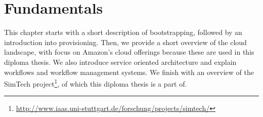 \chapter{Fundamentals}
\label{fundamentals}

This chapter starts with a short description of bootstrapping, followed by an introduction into provisioning.
Then, we provide a short overview of the cloud landscape, with focus on Amazon's cloud offerings because these are used in this diploma thesis.
We also introduce service oriented architecture and explain workflows and workflow management systems.
We finish with an overview of the SimTech project\footnote{\url{http://www.iaas.uni-stuttgart.de/forschung/projects/simtech/}}, of which this diploma thesis is a part of.







